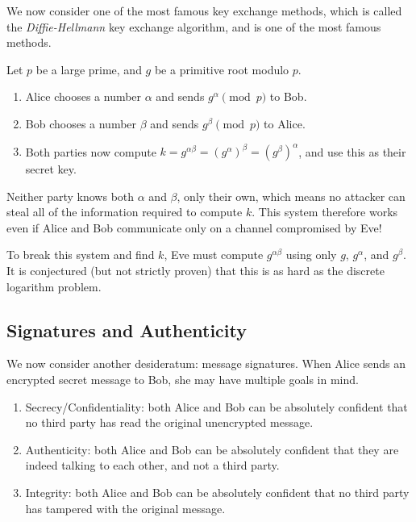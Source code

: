 \documentclass{article}
\begin{document}
We now consider one of the most famous key exchange methods, which is called the \textit{Diffie-Hellmann} key exchange algorithm, and is one of the most famous methods.

Let $p$ be a large prime, and $g$ be a primitive root modulo $p$.
\begin{enumerate}
    \item Alice chooses a number $\alpha$ and sends $g^\alpha \pmod p$ to Bob.
    \item Bob chooses a number $\beta$ and sends $g^\beta \pmod p$ to Alice.
    \item Both parties now compute $k = g^{\alpha\beta} = (g^\alpha)^\beta = (g^\beta)^\alpha$, and use this as their secret key.
\end{enumerate}
Neither party knows both $\alpha$ and $\beta$, only their own, which means no attacker can steal all of the information required to compute $k$. This system therefore works even if Alice and Bob communicate only on a channel compromised by Eve!

To break this system and find $k$, Eve must compute $g^{\alpha\beta}$ using only $g$, $g^\alpha$, and $g^\beta$. It is conjectured (but not strictly proven) that this is as hard as the discrete logarithm problem.


\subsection{Signatures and Authenticity}
\label{section-cryptography-signatures}

We now consider another desideratum: message signatures. When Alice sends an encrypted secret message to Bob, she may have multiple goals in mind.

\begin{enumerate}
    \item Secrecy/Confidentiality: both Alice and Bob can be absolutely confident that no third party has read the original unencrypted message.
    \item Authenticity: both Alice and Bob can be absolutely confident that they are indeed talking to each other, and not a third party.
    \item Integrity: both Alice and Bob can be absolutely confident that no third party has tampered with the original message.
\end{enumerate}
\end{document}
